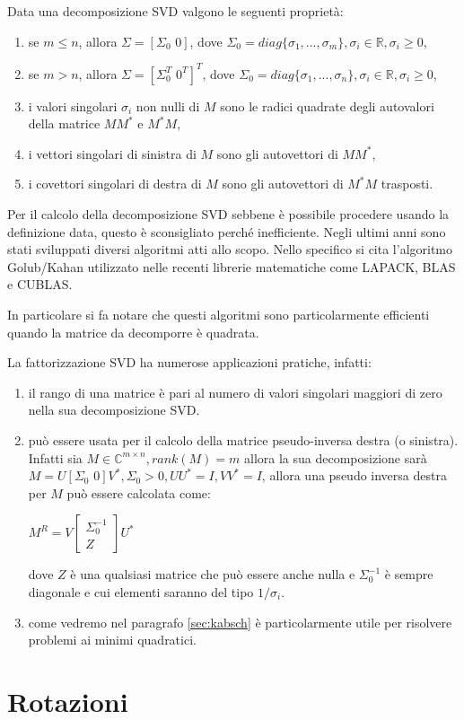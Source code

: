\begin{prop}
	Data una decomposizione SVD valgono le seguenti proprietà:
	\begin{enumerate}
		\item se $ m \le n$, allora $\Sigma = [\Sigma_0 \, \, 0]$, dove $\Sigma_0 = diag \{\sigma_1, ..., \sigma_m \}, \sigma_i \in \mathbb{R}, \sigma_i \ge 0$,
		\item se $ m > n$, allora $\Sigma = [\Sigma_0^T \, \, 0^T]^T$, dove $\Sigma_0 = diag \{\sigma_1, ..., \sigma_n \}, \sigma_i \in \mathbb{R}, \sigma_i \ge 0$,	 
		\item i valori singolari $\sigma_i$ non nulli di $M$ sono le radici quadrate degli autovalori della matrice $MM^*$ e $M^*M$,
		\item i vettori singolari di sinistra di $M$ sono gli autovettori di $MM^{*}$,
		\item i covettori singolari di destra di $M$ sono gli autovettori di $M^{*}M$ trasposti.
	\end{enumerate}
\end{prop}

Per il calcolo della decomposizione SVD sebbene è possibile procedere usando la definizione data, questo è sconsigliato perché inefficiente. Negli ultimi anni sono stati sviluppati diversi algoritmi atti allo scopo. Nello specifico si cita l'algoritmo Golub/Kahan utilizzato nelle recenti librerie matematiche come LAPACK, BLAS e CUBLAS.

In particolare si fa notare che questi algoritmi sono particolarmente efficienti quando la matrice da decomporre è quadrata.

La fattorizzazione SVD ha numerose applicazioni pratiche, infatti:
\begin{enumerate}
	\item il rango di una matrice è pari al numero di valori singolari maggiori di zero nella sua decomposizione SVD.
	\item può essere usata per il calcolo della matrice pseudo-inversa destra (o sinistra). Infatti sia $M \in \mathbb{C}^{m \times n}, rank(M) = m$ allora la sua decomposizione sarà $M = U [ \Sigma_0 \,\, 0 ] V^*, \Sigma_0 > 0, UU^* = I, VV^* = I$, allora una pseudo inversa destra per $M$ può essere calcolata come:
	\begin{center}
		$M^{R} = V 
		\begin{bmatrix}
			\Sigma_0^{-1} \\
			Z
		\end{bmatrix} U^*$
	\end{center} 
	dove $Z$ è una qualsiasi matrice che può essere anche nulla e $\Sigma_0^{-1}$ è sempre diagonale e cui elementi saranno del tipo $1/\sigma_i$.
	\item come vedremo nel paragrafo \ref{sec:kabsch} è particolarmente utile per risolvere problemi ai minimi quadratici.
\end{enumerate}


\section{Rotazioni}